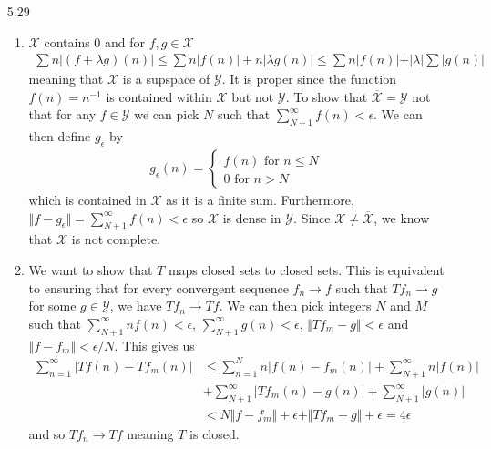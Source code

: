 \documentclass[11pt,letter]{article}
\begin{document}
\begin{enumerate}
\item [5.29] \begin{enumerate}
    \item $\mathcal{X}$ contains $0$ and for $f,g \in \mathcal{X}$
    \begin{align*}
        \sum n \vert (f + \lambda g)(n) \vert \le \sum n \vert f(n) \vert + n \vert \lambda g(n) \vert \le \sum n \vert f(n) \vert + \vert \lambda \vert \sum \vert g(n) \vert
    \end{align*}
    meaning that $\mathcal{X}$ is a supspace of $\mathcal{Y}$. It is proper since the function $f(n) = n^{-1}$ is contained within $\mathcal{X}$ but not $\mathcal{Y}$. To show that $\overline{\mathcal{X}} = \mathcal{Y}$ not that for any $f \in \mathcal{Y}$ we can pick $N$ such that $\sum_{N+1}^\infty f(n) < \epsilon$. We can then define $g_\epsilon$ by
    \begin{align*}
        g_\epsilon(n) = \begin{cases} f(n) \text{ for } n \le N \\ 0 \text{ for } n > N \end{cases}
    \end{align*}
    which is contained in $\mathcal{X}$ as it is a finite sum. Furthermore,$\Vert f - g_\epsilon \Vert = \sum_{N+1}^\infty f(n) < \epsilon$ so $\mathcal{X}$ is dense in $\mathcal{Y}$. Since $\mathcal{X} \ne \overline{\mathcal{X}}$, we know that $\mathcal{X}$ is not complete.
    
    \item We want to show that $T$ maps closed sets to closed sets. This is equivalent to ensuring that for every convergent sequence $f_n \rightarrow f$ such that $Tf_n \rightarrow g$ for some $g \in \mathcal{Y}$, we have $Tf_n \rightarrow Tf$. We can then pick integers $N$ and $M$ such that $\sum_{N+1}^\infty nf(n) < \epsilon$, $\sum_{N+1}^\infty g(n) < \epsilon$, $\Vert Tf_m - g \Vert < \epsilon$ and $\Vert f - f_m \Vert < \epsilon/N$. This gives us
    \begin{align*}
        \sum_{n=1}^\infty \vert Tf(n) - Tf_m(n) \vert & \le \sum_{n=1}^{N} n \vert f(n) - f_m(n) \vert + \sum_{N+1}^\infty n \vert f(n) \vert \\
        & + \sum_{N+1}^\infty \vert Tf_m(n) - g(n) \vert + \sum_{N+1}^\infty \vert g(n) \vert \\
        & < N \Vert f - f_m \Vert + \epsilon + \Vert Tf_m - g \Vert + \epsilon = 4 \epsilon
    \end{align*}
    and so $Tf_n \rightarrow Tf$ meaning $T$ is closed.


\end{enumerate}
\end{enumerate}
\end{document}
